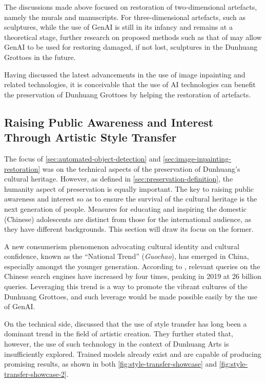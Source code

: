 The discussions made above focused on restoration of two-dimensional artefacts, namely the murals and manuscripts.
For three-dimensional artefacts, such as sculptures, while the use of GenAI is still in its infancy and remains
at a theoretical stage, further research on proposed methods such as that of
 may allow GenAI to be used for restoring damaged, if not
lost, sculptures in the Dunhuang Grottoes in the future.

Having discussed the latest advancements in the use of image inpainting and related technologies, it is conceivable
that the use of AI technologies can benefit the preservation of Dunhuang Grottoes by helping the restoration of
artefacts.

\subsection{Raising Public Awareness and Interest Through Artistic Style Transfer}

The focus of \cref{sec:automated-object-detection} and \cref{sec:image-inpainting-restoration} was on the
technical aspects of the preservation of Dunhuang's cultural heritage. However, as defined in
\cref{sec:preservation-definition}, the humanity aspect of preservation is equally important.
The key to raising public awareness and interest so as to ensure the survival of the cultural heritage
is the next generation of people. Measures for educating and inspiring the domestic (Chinese) adolescents
are distinct from those for the international audience, as they have different backgrounds. This section will
draw its focus on the former.

A new consumerism phenomenon advocating cultural identity and cultural confidence, known as the ``National Trend''
(\textit{Guochao}), has emerged in China, especially amongst the younger generation. According to
, relevant queries on the Chinese search engines have increased by four times,
peaking in 2019 at 26 billion queries. Leveraging this trend is a way to promote the vibrant cultures of the
Dunhuang Grottoes, and such leverage would be made possible easily by the use of GenAI.

On the technical side,  discussed that the use of style transfer has
long been a dominant trend in the field of artistic creation. They further stated that, however, the use of such
technology in the context of Dunhuang Arts is insufficiently explored. Trained models already exist and are capable
of producing promising results, as shown in both \cref{fig:style-transfer-showcase} and
\cref{fig:style-transfer-showcase-2}.

